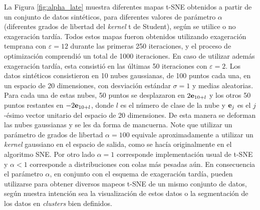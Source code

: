 La Figura \ref{fig:alpha_late} muestra diferentes mapas t-SNE obtenidos a partir de un conjunto de datos sintéticos, para diferentes valores de parámetro $\alpha$ (diferentes grados de libertad del \textit{kernel} t de Student), según se utilice o no exageración tardía. Todos estos mapas fueron obtenidos utilizando exageración temprana con $\varepsilon = 12$ durante las primeras 250 iteraciones, y el proceso de optimización comprendió un total de 1000 iteraciones. En caso de utilizar además exageración tardía, esta consistió en las últimas 50 iteraciones con $\varepsilon = 2$. Los datos sintéticos consistieron en 10 nubes gaussianas, de 100 puntos cada una, en un espacio de 20 dimensiones, con desviación estándar $\sigma = 1$ y medias aleatorias. Para cada una de estas nubes, 50 puntos se desplazaron en $2\vb{e}_{10+l}$ y los otros 50 puntos restantes en $-2\vb{e}_{10+l}$, donde $l$ es el número de clase de la nube y $\vb{e}_j$ es el $j$-ésimo vector unitario del espacio de 20 dimensiones. De esta manera se deforman las nubes gaussianas y se les da forma de mancuerna. Note que utilizar un parámetro de grados de libertad $\alpha=100$ equivale aproximadamente a utilizar un \textit{kernel} gaussiano en el espacio de salida, como se hacía originalmente en el algoritmo SNE. Por otro lado $\alpha=1$ corresponde implementación usual de t-SNE y $\alpha<1$ corresponde a distribuciones con colas más pesadas aún. En consecuencia el parámetro $\alpha$, en conjunto con el esquema de exageración tardía, pueden utilizarse para obtener diversos mapeos t-SNE de un mismo conjunto de datos, según nuestra intención sea la visualización de estos datos o la segmentación de los datos en \textit{clusters} bien definidos.

